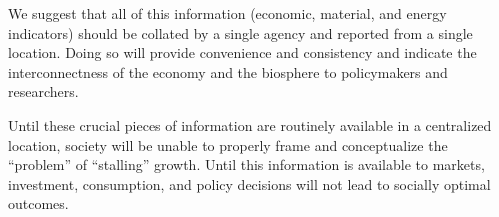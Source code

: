 We suggest that all of this information 
(economic, material, and energy indicators) 
should be collated by a single agency and
reported from a single location.
Doing so will provide convenience and consistency and
indicate the interconnectness of the economy and the biosphere
to policymakers and researchers.

Until these crucial pieces of information are routinely available 
in a centralized location, 
society will be unable to properly frame and conceptualize 
the ``problem'' of ``stalling'' growth. 
Until this information is available to markets,
investment, consumption, and policy decisions will
not lead to socially optimal outcomes.














%
%

